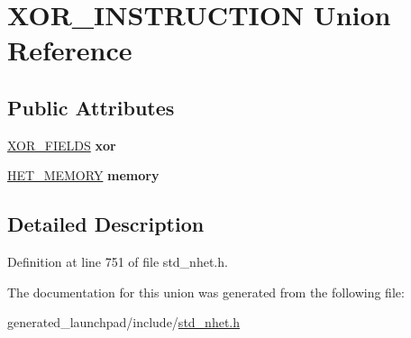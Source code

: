 \hypertarget{unionXOR__INSTRUCTION}{}\section{X\+O\+R\+\_\+\+I\+N\+S\+T\+R\+U\+C\+T\+I\+ON Union Reference}
\label{unionXOR__INSTRUCTION}
\subsection*{Public Attributes}
\begin{DoxyCompactItemize}
\item 
\mbox{\label{unionXOR__INSTRUCTION_a964d73935b539ac2c02df876fbba8620}} 
\mbox{\hyperlink{structXOR__format}{X\+O\+R\+\_\+\+F\+I\+E\+L\+DS}} {\bfseries xor}
\item 
\mbox{\label{unionXOR__INSTRUCTION_a515e16be52644b6b09af7d85c78fd289}} 
\mbox{\hyperlink{structmemory__format}{H\+E\+T\+\_\+\+M\+E\+M\+O\+RY}} {\bfseries memory}
\end{DoxyCompactItemize}


\subsection{Detailed Description}


Definition at line 751 of file std\+\_\+nhet.\+h.



The documentation for this union was generated from the following file\+:\begin{DoxyCompactItemize}
\item 
generated\+\_\+launchpad/include/\mbox{\hyperlink{std__nhet_8h}{std\+\_\+nhet.\+h}}\end{DoxyCompactItemize}

